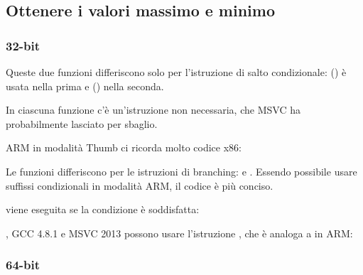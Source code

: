 \subsection{Ottenere i valori massimo e minimo}

\subsubsection{32-bit}






Queste due funzioni differiscono solo per l'istruzione di salto condizionale: 
 () è usata nella prima
e  () nella seconda.

\myindex{\CompilerAnomaly}
\label{MSVC_double_JMP_anomaly}

In ciascuna funzione c'è un'istruzione \JMP non necessaria, che MSVC ha probabilmente lasciato per sbaglio.


ARM in modalità Thumb ci ricorda molto codice x86:




Le funzioni differiscono per le istruzioni di branching:  e .
Essendo possibile usare suffissi condizionali in modalità ARM, il codice è più conciso.

 viene eseguita se la condizione è soddisfatta:



\Optimizing, GCC 4.8.1 e MSVC 2013 possono usare l'istruzione , che è analoga a  in ARM:



\subsubsection{64-bit}


